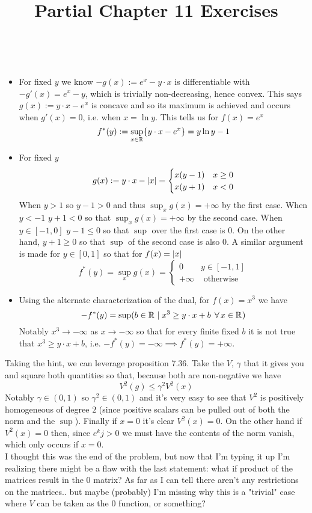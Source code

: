 \documentclass{article}
\title{Partial Chapter 11 Exercises}
\newenvironment{ex}[1]
  {\renewcommand\theexercise{#1}\exercise}
  {\endexercise}
\newcommand{\R}[1]{\mathbb{R}^{#1}}
\begin{document}
\begin{ex}{11.2} %
  \, \\
  \begin{itemize}
    \item
      For fixed $y$ we know $-g(x) := e^x - y \cdot x$ is differentiable with $-g'(x) = e^x - y$, which is trivially non-decreasing, hence convex. This says $g(x) := y \cdot x - e^x$ is concave and so its maximum is achieved and occurs when $g'(x) = 0$, i.e. when $x = \ln y$. This tells us for $f(x) = e^x$
      $$
      f^*(y) := \sup_{x \in \R{}} \braces{ y \cdot x - e^x } = y \ln y - 1
      $$
    \item
      For fixed $y$
      $$
      g(x) := y \cdot x - \lvert x\rvert = \begin{cases}
        x ( y - 1 ) & x \ge 0 \\
        x ( y + 1 ) & x < 0
      \end{cases}
      $$
      When $y > 1$ so $y - 1 > 0$ and thus $\sup_x g(x) = +\infty$ by the first case. When $y < -1$ $y + 1 < 0$ so that $\sup_x g(x) = +\infty$ by the second case. When $y \in [-1, 0]$ $y - 1 \le 0$ so that $\sup$ over the first case is $0$. On the other hand, $y + 1 \ge 0$ so that $\sup$ of the second case is also $0$. A similar argument is made for $y \in [0, 1]$ so that for $f(x) = \lvert x\rvert$
      $$
      f^*(y) = \sup_x g(x) = \begin{cases}
        0 & y \in [-1, 1] \\
        +\infty & \text{ otherwise}
      \end{cases}
      $$
    \item
      Using the alternate characterization of the dual, for $f(x) = x^3$ we have
      $$
      -f^*(y) = \sup\parens{ b \in \R{} \mid x^3 \ge y \cdot x + b \, \forall x \in \R{} }
      $$
      Notably $x^3 \to -\infty$ as $x \to -\infty$ so that for every finite fixed $b$ it is not true that $x^3 \ge y \cdot x + b$, i.e. $-f^*(y) = -\infty \implies f^*(y) = +\infty$.
  \end{itemize}
\end{ex} %
\begin{ex}{11.7} %
  Taking the hint, we can leverage proposition 7.36. Take the $V$, $\gamma$ that it gives you and square both quantities so that, because both are non-negative we have
  $$
  V^2(g) \le \gamma^2 V^2(x)
  $$
  Notably $\gamma \in (0, 1)$ so $\gamma^2 \in (0, 1)$ and it's very easy to see that $V^2$ is positively homogeneous of degree $2$ (since positive scalars can be pulled out of both the norm and the $\sup$). Finally if $x = 0$ it's clear $V^2(x) = 0$. On the other hand if $V^2(x) = 0$ then, since $e^kj > 0$ we must have the contents of the norm vanish, which only occurs if $x = 0$.
  \, \\

  I thought this was the end of the problem, but now that I'm typing it up I'm realizing there might be a flaw with the last statement: what if product of the matrices result in the $0$ matrix? As far as I can tell there aren't any restrictions on the matrices.. but maybe (probably) I'm missing why this is a "trivial" case where $V$ can be taken as the $0$ function, or something?
\end{ex} %
\end{document}

